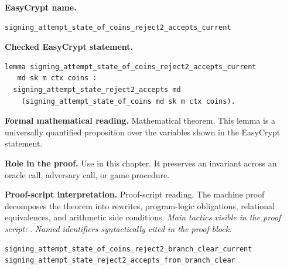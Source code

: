 \begin{formaltheorem}
\noindent\textbf{EasyCrypt name.}
\begin{lstlisting}[language=EasyCrypt,basicstyle=\ttfamily\scriptsize]
signing_attempt_state_of_coins_reject2_accepts_current
\end{lstlisting}
\noindent\textbf{Checked EasyCrypt statement.}
\begin{lstlisting}[language=EasyCrypt,basicstyle=\ttfamily\scriptsize]
lemma signing_attempt_state_of_coins_reject2_accepts_current
   md sk m ctx coins :
  signing_attempt_state_reject2_accepts md
    (signing_attempt_state_of_coins md sk m ctx coins).
\end{lstlisting}
\noindent\textbf{Formal mathematical reading.}
Mathematical theorem. This lemma is a universally quantified proposition over the variables shown in the EasyCrypt statement.

\noindent\textbf{Role in the proof.}
Use in this chapter. It preserves an invariant across an oracle call, adversary call, or game procedure.

\noindent\textbf{Proof-script interpretation.}
Proof-script reading. The machine proof decomposes the theorem into rewrites, program-logic obligations, relational equivalences, and arithmetic side conditions.
\emph{Main tactics visible in the proof script:} .
\emph{Named identifiers syntactically cited in the proof block:}
\begin{lstlisting}[language=EasyCrypt,basicstyle=\ttfamily\scriptsize]
signing_attempt_state_of_coins_reject2_branch_clear_current
signing_attempt_state_reject2_accepts_from_branch_clear
\end{lstlisting}

\end{formaltheorem}

